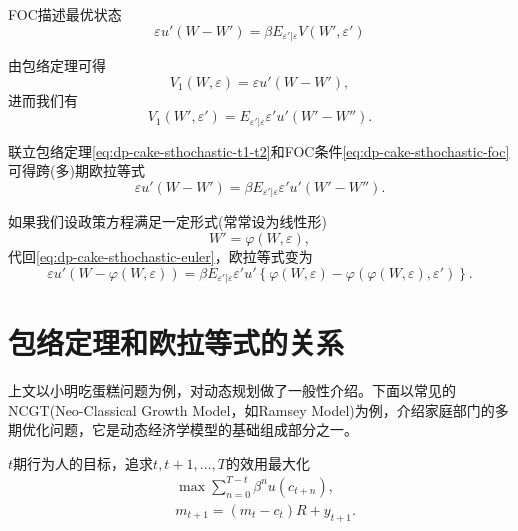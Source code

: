 FOC描述最优状态
\begin{equation}
  \label{eq:dp-cake-sthochastic-foc}
  \varepsilon u' \left( W - W' \right)
  = \beta E_{\varepsilon' | \varepsilon} V \left(
  W', \varepsilon' \right)
\end{equation}

由包络定理可得
\begin{equation*}
  V_{1}\left(W, \varepsilon \right)
  = \varepsilon u' \left( W - W' \right),
\end{equation*}
进而我们有
\begin{equation}
  \label{eq:dp-cake-sthochastic-t1-t2}
  V_{1} \left(W', \varepsilon' \right)
  = E_{\varepsilon' | \varepsilon}
  \varepsilon' u' \left( W' - W'' \right).
\end{equation}

联立包络定理\eqref{eq:dp-cake-sthochastic-t1-t2}和FOC条件\eqref{eq:dp-cake-sthochastic-foc}可得跨(多)期欧拉等式
\begin{equation}
  \label{eq:dp-cake-sthochastic-euler}
  \varepsilon u' \left( W - W' \right)
  = \beta E_{\varepsilon' | \varepsilon} \varepsilon' u' \left( W' - W'' \right).
\end{equation}

如果我们设政策方程满足一定形式(常常设为线性形)
\begin{equation*}
  W' = \varphi \left( W, \varepsilon \right),
\end{equation*}
代回\eqref{eq:dp-cake-sthochastic-euler}，欧拉等式变为
\begin{equation}
  \label{eq:dp-cake-sthochastic-euler-approx}
  \varepsilon u' \left( W - \varphi \left( W, \varepsilon \right) \right)
  = \beta E_{\varepsilon' | \varepsilon} \varepsilon' u' \left\{
  \varphi \left( W, \varepsilon \right) -
  \varphi \left(
  \varphi \left( W, \varepsilon \right), \varepsilon'
  \right)
  \right\}.
\end{equation}

\section{包络定理和欧拉等式的关系}
\label{sec:dp-euler-relation}
上文以小明吃蛋糕问题为例，对动态规划做了一般性介绍。下面以常见的NCGT(Neo-Classical Growth Model，如Ramsey Model)为例，介绍家庭部门的多期优化问题，它是动态经济学模型的基础组成部分之一。

$t$期行为人的目标，追求$t, t+1, \ldots, T$的效用最大化
\begin{equation}
  \label{eq:dp-euler-relation-problem}
  \begin{split}
  & \max \sum_{n=0}^{T-t} \beta^{n} u \left(c_{t+n} \right), \\
  & m_{t+1} = \left( m_{t} - c_{t} \right) R + y_{t+1}.
\end{split}
\end{equation}

